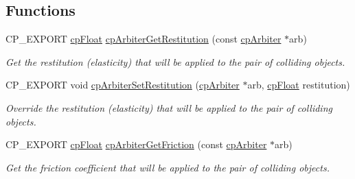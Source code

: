 \subsection*{Functions}
\begin{DoxyCompactItemize}
\item 
\mbox{\label{group__cp_arbiter_ga6c9e28294c87dc6a5777b0f0c24fda83}} 
C\+P\+\_\+\+E\+X\+P\+O\+RT \mbox{\hyperlink{group__basic_types_gac1ed65573e035bf892505768c852d8d3}{cp\+Float}} \mbox{\hyperlink{group__cp_arbiter_ga6c9e28294c87dc6a5777b0f0c24fda83}{cp\+Arbiter\+Get\+Restitution}} (const \mbox{\hyperlink{structcp_arbiter}{cp\+Arbiter}} $\ast$arb)
\begin{DoxyCompactList}\small\item\em Get the restitution (elasticity) that will be applied to the pair of colliding objects. \end{DoxyCompactList}\item 
\mbox{\label{group__cp_arbiter_gaefa04fa347992f1e5903c89e480325ee}} 
C\+P\+\_\+\+E\+X\+P\+O\+RT void \mbox{\hyperlink{group__cp_arbiter_gaefa04fa347992f1e5903c89e480325ee}{cp\+Arbiter\+Set\+Restitution}} (\mbox{\hyperlink{structcp_arbiter}{cp\+Arbiter}} $\ast$arb, \mbox{\hyperlink{group__basic_types_gac1ed65573e035bf892505768c852d8d3}{cp\+Float}} restitution)
\begin{DoxyCompactList}\small\item\em Override the restitution (elasticity) that will be applied to the pair of colliding objects. \end{DoxyCompactList}\item 
\mbox{\label{group__cp_arbiter_ga367b1ad68643be3f0a5f979ddf27b575}} 
C\+P\+\_\+\+E\+X\+P\+O\+RT \mbox{\hyperlink{group__basic_types_gac1ed65573e035bf892505768c852d8d3}{cp\+Float}} \mbox{\hyperlink{group__cp_arbiter_ga367b1ad68643be3f0a5f979ddf27b575}{cp\+Arbiter\+Get\+Friction}} (const \mbox{\hyperlink{structcp_arbiter}{cp\+Arbiter}} $\ast$arb)
\begin{DoxyCompactList}\small\item\em Get the friction coefficient that will be applied to the pair of colliding objects. \end{DoxyCompactList}\item 
\mbox{\label{group__cp_arbiter_gab049136b2e62e92adfde8f6422664f71}} 

\end{DoxyCompactItemize}

